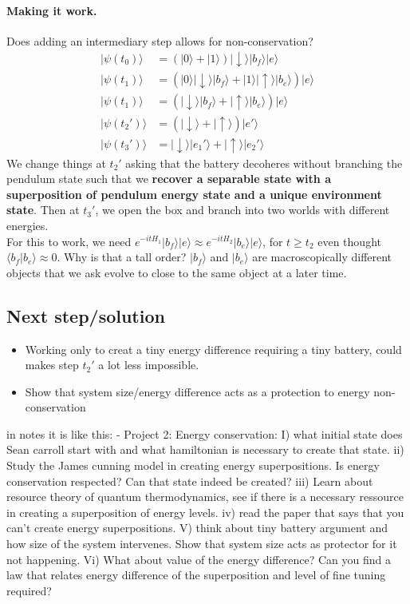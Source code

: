 \documentclass{article}
\begin{document}
\paragraph{Making it work.} Does adding an intermediary step allows for non-conservation?
\begin{align}
    |\psi(t_0)\rangle&=(|0\rangle+|1\rangle)|\downarrow\rangle|b_f\rangle|e\rangle\\
    |\psi(t_1)\rangle&=(|0\rangle|\downarrow\rangle|b_f\rangle+|1\rangle|\uparrow\rangle|b_e\rangle)|e\rangle\\
    |\psi(t_1)\rangle&=(|\downarrow\rangle|b_f\rangle+|\uparrow\rangle|b_e\rangle)|e\rangle\\
    |\psi(t_2')\rangle&=(|\downarrow\rangle+|\uparrow\rangle)|e'\rangle\\
    |\psi(t_3')\rangle&=|\downarrow\rangle|e_1'\rangle+|\uparrow\rangle|e_2'\rangle
\end{align}
We change things at $t_2'$ asking that the battery decoheres without branching the pendulum state such that we \textbf{recover a separable state with a superposition of pendulum energy state and a unique environment state}. Then at $t_3'$, we open the box and branch into two worlds with different energies.\\

For this to work, we need $e^{-itH_1}|b_f\rangle|e\rangle\approx e^{-itH_2}|b_e\rangle|e\rangle$, for $t\geq t_2$ even thought $\langle b_f|b_e\rangle\approx0$. Why is that a tall order? $|b_f\rangle$ and $|b_e\rangle$ are macroscopically different objects that we ask evolve to close to the same object at a later time.

\subsection{Next step/solution}

\begin{itemize}
    \item Working only to creat a tiny energy difference requiring a tiny battery, could makes step $t_2'$ a lot less impossible.
    \item Show that system size/energy difference acts as a protection to energy non-conservation
    
\end{itemize}

in notes it is like this:
- Project 2: Energy conservation: I) what initial state does Sean carroll start with and what hamiltonian is necessary to create that state. ii) Study the James cunning model in creating energy superpositions. Is energy conservation respected? Can that state indeed be created? iii) Learn about resource theory of quantum thermodynamics, see if there is a necessary ressource in creating a superposition of energy levels. iv) read the paper that says that you can’t create energy superpositions. V) think about tiny battery argument and how size of the system intervenes. Show that system size acts as protector for it not happening. Vi) What about value of the energy difference? Can you find a law that relates energy difference of the superposition and level of fine tuning required? 
\end{document}
